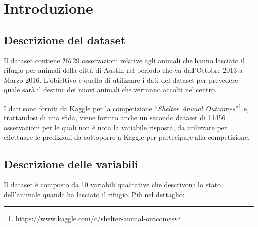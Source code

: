 
\section{Introduzione}

\subsection{Descrizione del dataset}

Il dataset contiene 26729 osservazioni relative agli animali che hanno lasciato il rifugio per animali della città di Austin nel periodo che va dall'Ottobre 2013 a Marzo 2016.
L'obiettivo è quello di utilizzare i dati del dataset per prevedere quale sarà il destino dei nuovi animali che verranno accolti nel centro.

I dati sono forniti da Kaggle per la competizione ``\textit{Shelter Animal Outcomes}''\footnote{\url{https://www.kaggle.com/c/shelter-animal-outcomes}} e, trattandosi di una sfida, viene fornito anche un secondo dataset di 11456 osservazioni per le quali non è nota la variabile risposta, da utilizzare per effettuare le predizioni da sottoporre a Kaggle per partecipare alla competizione.

\subsection{Descrizione delle variabili}

Il dataset è composto da 10 variabili qualitative che descrivono lo stato dell'animale quando ha lasciato il rifugio.
Più nel dettaglio:

